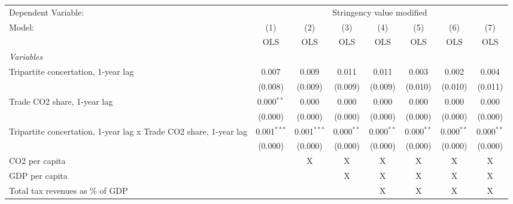 
\begingroup
\centering
\begin{tabular}{lccccccc}
   \toprule
   Dependent Variable: & \multicolumn{7}{c}{Stringency value modified}\\
   Model:                                                            & (1)           & (2)           & (3)          & (4)          & (5)          & (6)          & (7)\\  
                                                                     &  OLS          & OLS           & OLS          & OLS          & OLS          & OLS          & OLS\\  
   \midrule
   \emph{Variables}\\
   Tripartite concertation, 1-year lag                               & 0.007         & 0.009         & 0.011        & 0.011        & 0.003        & 0.002        & 0.004\\   
                                                                     & (0.008)       & (0.009)       & (0.009)      & (0.009)      & (0.010)      & (0.010)      & (0.011)\\   
   Trade CO2 share, 1-year lag                                       & 0.000$^{**}$  & 0.000         & 0.000        & 0.000        & 0.000        & 0.000        & 0.000\\   
                                                                     & (0.000)       & (0.000)       & (0.000)      & (0.000)      & (0.000)      & (0.000)      & (0.000)\\   
   Tripartite concertation, 1-year lag x Trade CO2 share, 1-year lag & 0.001$^{***}$ & 0.001$^{***}$ & 0.000$^{**}$ & 0.000$^{**}$ & 0.000$^{**}$ & 0.000$^{**}$ & 0.000$^{**}$\\   
                                                                     & (0.000)       & (0.000)       & (0.000)      & (0.000)      & (0.000)      & (0.000)      & (0.000)\\   
   CO2 per capita                                                    &               & X             & X            & X            & X            & X            & X\\  
   GDP per capita                                                    &               &               & X            & X            & X            & X            & X\\  
   Total tax revenues as \% of GDP                                   &               &               &              & X            & X            & X            & X\\  

\end{tabular}
